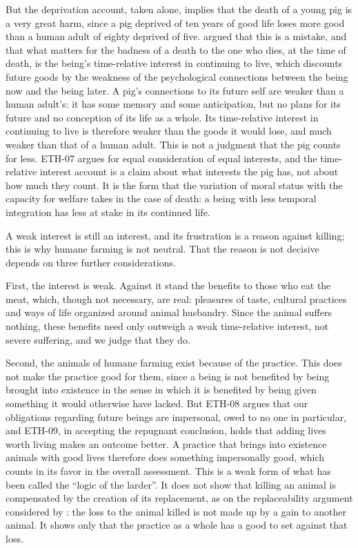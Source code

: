 \documentclass{situationist-preprint}
\begin{document}
But the deprivation account, taken alone, implies that the death of a young pig is a very great harm, since a pig deprived of ten years of good life loses more good than a human adult of eighty deprived of five. \citet{McMahan2002} argued that this is a mistake, and that what matters for the badness of a death to the one who dies, at the time of death, is the being's time-relative interest in continuing to live, which discounts future goods by the weakness of the psychological connections between the being now and the being later. A pig's connections to its future self are weaker than a human adult's: it has some memory and some anticipation, but no plans for its future and no conception of its life as a whole. Its time-relative interest in continuing to live is therefore weaker than the goods it would lose, and much weaker than that of a human adult. This is not a judgment that the pig counts for less. ETH-07 argues for equal consideration of equal interests, and the time-relative interest account is a claim about what interests the pig has, not about how much they count. It is the form that the variation of moral status with the capacity for welfare takes in the case of death: a being with less temporal integration has less at stake in its continued life.

A weak interest is still an interest, and its frustration is a reason against killing; this is why humane farming is not neutral. That the reason is not decisive depends on three further considerations.

First, the interest is weak. Against it stand the benefits to those who eat the meat, which, though not necessary, are real: pleasures of taste, cultural practices and ways of life organized around animal husbandry. Since the animal suffers nothing, these benefits need only outweigh a weak time-relative interest, not severe suffering, and we judge that they do.

Second, the animals of humane farming exist because of the practice. This does not make the practice good for them, since a being is not benefited by being brought into existence in the sense in which it is benefited by being given something it would otherwise have lacked. But ETH-08 argues that our obligations regarding future beings are impersonal, owed to no one in particular, and ETH-09, in accepting the repugnant conclusion, holds that adding lives worth living makes an outcome better. A practice that brings into existence animals with good lives therefore does something impersonally good, which counts in its favor in the overall assessment. This is a weak form of what has been called the \enquote{logic of the larder}. It does not show that killing an animal is compensated by the creation of its replacement, as on the replaceability argument considered by \citet{Singer1993}: the loss to the animal killed is not made up by a gain to another animal. It shows only that the practice as a whole has a good to set against that loss.
\end{document}

